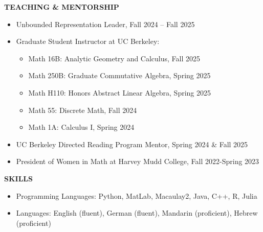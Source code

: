\documentclass[11pt]{article}
\newcommand{\hdr}[1]{\textcolor{blue(ryb)}{\textbf{#1}}}
\begin{document}
\bigskip


\hdr{TEACHING \& MENTORSHIP}\\
\begin{itemize}
\item Unbounded Representation Leader, Fall 2024 -- Fall 2025
\item Graduate Student Instructor at UC Berkeley:
  \begin{itemize}
  \item Math 16B: Analytic Geometry and Calculus, Fall 2025
  \item Math 250B: Graduate Commutative Algebra, Spring 2025
  \item Math H110: Honors Abstract Linear Algebra, Spring 2025
  \item Math 55: Discrete Math, Fall 2024
  \item Math 1A: Calculus I, Spring 2024
  \end{itemize}
\item UC Berkeley Directed Reading Program Mentor, Spring 2024 \& Fall 2025
\item President of Women in Math at Harvey Mudd College, Fall 2022-Spring 2023
\end{itemize}

\bigskip

\hdr{SKILLS}\\
\begin{itemize}
\item 
Programming Languages: Python, MatLab, Macaulay2, Java, C++, R, Julia\\
\item 
Languages: English (fluent), German (fluent), Mandarin (proficient), Hebrew (proficient)
\end{itemize}
\end{document}
